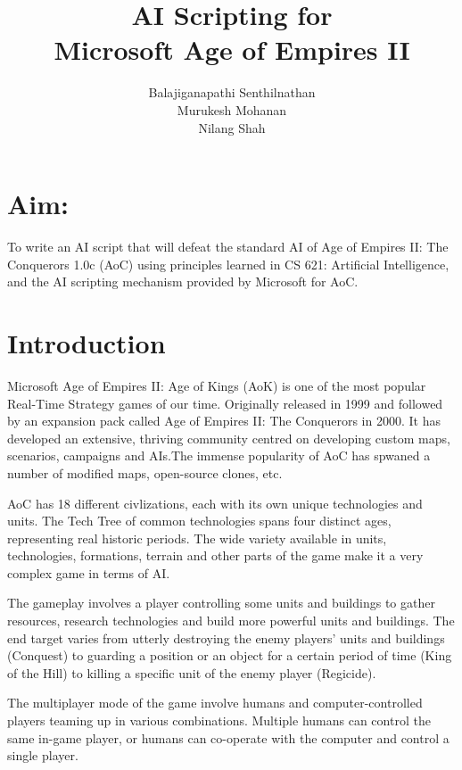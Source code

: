 \documentclass[a4paper,12pt]{article}
\title{AI Scripting for \\Microsoft{\small \texttrademark} Age of Empires II{\small \texttrademark}}
\author{Balajiganapathi Senthilnathan\\Murukesh Mohanan\\Nilang Shah}
\begin{document}
\maketitle
\section*{Aim:}
To write an AI script that will defeat the standard AI of Age of Empires II: The Conquerors 1.0c (AoC) 
using principles learned in CS 621: Artificial Intelligence, and the AI scripting mechanism provided by 
Microsoft for AoC.
\section*{Introduction}
Microsoft{\small \texttrademark} Age of Empires II: Age of Kings{\small \texttrademark} (AoK) is 
one of the most popular Real-Time Strategy games of our time. Originally released in 1999 
and followed by an expansion pack called Age of Empires II: The Conquerors{\small \texttrademark}
in 2000. It has developed an extensive, thriving community centred on developing custom maps, 
scenarios, campaigns and AIs.\footnotemark[1] The immense popularity of AoC has spwaned a number 
of modified maps, open-source clones, etc.

AoC has 18 different civlizations, each with its own unique technologies and units. The Tech Tree of 
common technologies spans four distinct ages, representing real historic periods.  The wide variety 
available in units, technologies, formations, terrain and other parts of the game make it a very complex 
game in terms of AI.

The gameplay involves a player controlling some units and buildings to gather resources, research 
technologies and build more powerful units and buildings. The end target varies from utterly destroying
the enemy players' units and buildings (Conquest) to guarding a position or an object for a certain 
period of time (King of the Hill) to killing a specific unit of the enemy player (Regicide). 

The multiplayer mode of the game involve humans and computer-controlled players teaming up in various
combinations. Multiple humans can control the same in-game player, or humans can co-operate with
the computer and control a single player.
\end{document}
